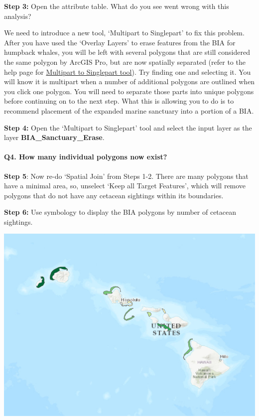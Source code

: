 \documentclass[
]{book}
\begin{document}
\textbf{Step 3:} Open the attribute table. What do you see went wrong with this analysis?

We need to introduce a new tool, `Multipart to Singlepart' to fix this problem. After you have used the `Overlay Layers' to erase features from the BIA for humpback whales, you will be left with several polygons that are still considered the same polygon by ArcGIS Pro, but are now spatially separated (refer to the help page for \href{https://pro.arcgis.com/en/pro-app/latest/tool-reference/data-management/multipart-to-singlepart.htm}{Multipart to Singlepart tool}). Try finding one and selecting it. You will know it is multipart when a number of additional polygons are outlined when you click one polygon. You will need to separate those parts into unique polygons before continuing on to the next step. What this is allowing you to do is to recommend placement of the expanded marine sanctuary into a portion of a BIA.

\textbf{Step 4:} Open the `Multipart to Singlepart' tool and select the input layer as the layer \textbf{BIA\_Sanctuary\_Erase}.

\hypertarget{q4.-how-many-individual-polygons-now-exist}{%
\paragraph*{Q4. How many individual polygons now exist?}\label{q4.-how-many-individual-polygons-now-exist}}

\textbf{Step 5}: Now re-do `Spatial Join' from Steps 1-2. There are many polygons that have a minimal area, so, unselect `Keep all Target Features', which will remove polygons that do not have any cetacean sightings within its boundaries.

\textbf{Step 6:} Use symbology to display the BIA polygons by number of cetacean sightings.

\includegraphics[width=0.75\linewidth]{images/05-bia-polygons}
\end{document}

